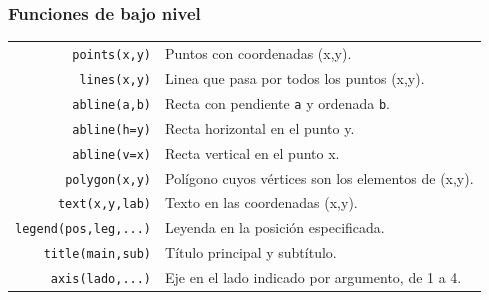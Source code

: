 \documentclass{beamer}
\begin{document}
\begin{frame}
\frametitle{Funciones de bajo nivel}

\begin{tabular}{rp{6cm}}
\texttt{points(x,y)} & Puntos con coordenadas (x,y). \\
\texttt{lines(x,y)} & Linea que pasa por todos los puntos (x,y). \\
\texttt{abline(a,b)} & Recta con pendiente \texttt{a} y ordenada \texttt{b}. \\
\texttt{abline(h=y)} & Recta horizontal en el punto y. \\
\texttt{abline(v=x)} & Recta vertical en el punto x. \\
\texttt{polygon(x,y)} & Polígono cuyos vértices son los elementos de (x,y). \\
\texttt{text(x,y,lab)} & Texto en las coordenadas (x,y). \\
\texttt{legend(pos,leg,...)} & Leyenda en la posición especificada. \\
\texttt{title(main,sub)} & Título principal y subtítulo. \\
\texttt{axis(lado,...)} & Eje en el lado indicado por argumento, de 1 a 4. \\
\end{tabular}
\end{frame}

\end{document}
